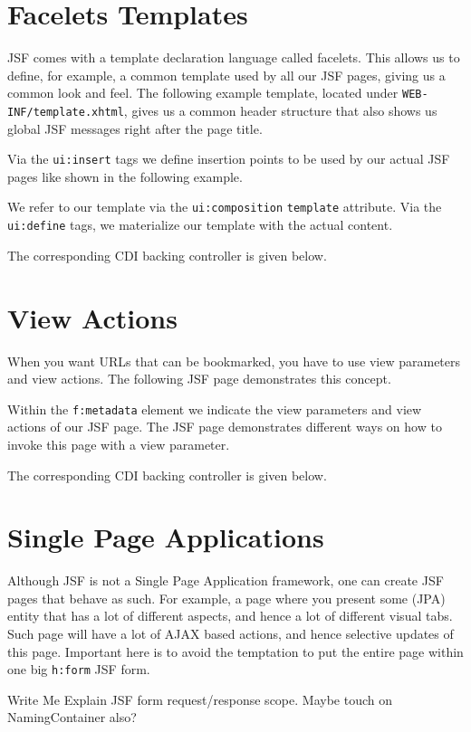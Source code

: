 \section{Facelets Templates}
JSF comes with a template declaration language called facelets.
This allows us to define, for example, a common template used by all our JSF pages,
giving us a common look and feel.
The following example template, located under \texttt{WEB-INF/template.xhtml},
gives us a common header structure that also shows us global JSF messages right after the page title.

Via the \texttt{ui:insert} tags we define insertion points to be used by our actual JSF pages like shown in the following example.

We refer to our template via the \texttt{ui:composition} \texttt{template} attribute.
Via the \texttt{ui:define} tags, we materialize our template with the actual content.

The corresponding CDI backing controller is given below.


\section{View Actions}
When you want URLs that can be bookmarked, you have to use view parameters and view actions.
The following JSF page demonstrates this concept.

Within the \texttt{f:metadata} element we indicate the view parameters and view actions of our JSF page.
The JSF page demonstrates different ways on how to invoke this page with a view parameter.

The corresponding CDI backing controller is given below.


\section{Single Page Applications}
Although JSF is not a Single Page Application framework, one can create JSF pages that behave as such.
For example, a page where you present some (JPA) entity that has a lot of different aspects, and hence a lot of different visual tabs.
Such page will have a lot of AJAX based actions, and hence selective updates of this page.
Important here is to avoid the temptation to put the entire page within one big \texttt{h:form} JSF form.
\begin{TODO}{Write Me}
Explain JSF form request/response scope.
Maybe touch on NamingContainer also?
\end{TODO}